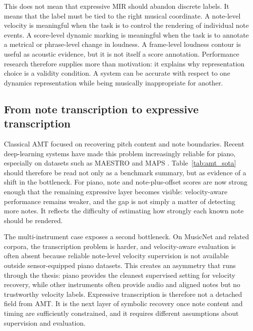 This does not mean that expressive MIR should abandon discrete labels. It means that the label must be tied to the right musical coordinate. A note-level velocity is meaningful when the task is to control the rendering of individual note events. A score-level dynamic marking is meaningful when the task is to annotate a metrical or phrase-level change in loudness. A frame-level loudness contour is useful as acoustic evidence, but it is not itself a score annotation. Performance research therefore supplies more than motivation: it explains why representation choice is a validity condition. A system can be accurate with respect to one dynamics representation while being musically inappropriate for another.

\subsection{From note transcription to expressive transcription}

Classical AMT focused on recovering pitch content and note boundaries. Recent deep-learning systems have made this problem increasingly reliable for piano, especially on datasets such as MAESTRO and MAPS \cite{amt2019ov,hawthorne2018onsets,hawthorne2021trans,kong2021hpt,toyama2023hft,yan2021semicrf,yan2024semicrf}. Table~\ref{tab:amt_sota} should therefore be read not only as a benchmark summary, but as evidence of a shift in the bottleneck. For piano, note and note-plus-offset scores are now strong enough that the remaining expressive layer becomes visible: velocity-aware performance remains weaker, and the gap is not simply a matter of detecting more notes. It reflects the difficulty of estimating how strongly each known note should be rendered.

The multi-instrument case exposes a second bottleneck. On MusicNet and related corpora, the transcription problem is harder, and velocity-aware evaluation is often absent because reliable note-level velocity supervision is not available outside sensor-equipped piano datasets. This creates an asymmetry that runs through the thesis: piano provides the cleanest supervised setting for velocity recovery, while other instruments often provide audio and aligned notes but no trustworthy velocity labels. Expressive transcription is therefore not a detached field from AMT. It is the next layer of symbolic recovery once note content and timing are sufficiently constrained, and it requires different assumptions about supervision and evaluation.

